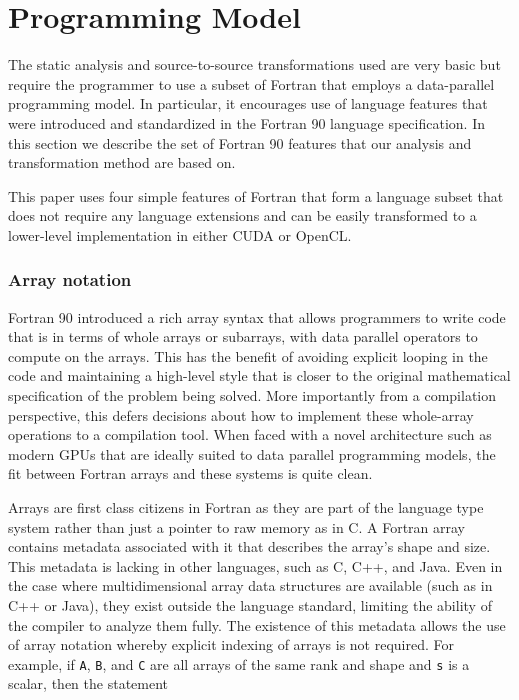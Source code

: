 \section{Programming Model}

The static analysis and source-to-source transformations used are very
basic but require the programmer to use a subset of Fortran
that employs a data-parallel programming model.  In particular, it
encourages use of language features that were introduced and
standardized in the Fortran 90 language specification.  In this
section we describe the set of Fortran 90 features that our analysis
and transformation method are based on.

This paper uses four simple features of Fortran that form a language subset
that does not require any language extensions and can be easily transformed
to a lower-level implementation in either CUDA or OpenCL.

\subsubsection*{Array notation}

Fortran 90 introduced a rich array syntax that allows programmers to
write code that is in terms of whole arrays or subarrays, with data
parallel operators to compute on the arrays.  This has the benefit of
avoiding explicit looping in the code and maintaining a high-level
style that is closer to the original mathematical specification of the
problem being solved.  More importantly from a compilation
perspective, this defers decisions about how to implement these
whole-array operations to a compilation tool.  When faced with a novel
architecture such as modern GPUs that are ideally suited to data parallel
programming models, the fit between Fortran arrays and these systems is
quite clean.

Arrays are first class citizens in Fortran as they are part of the language
type system rather than just a pointer to raw memory as in C. A Fortran array
contains metadata associated with it that describes the array's shape and
size. This metadata is lacking in other languages, such as C, C++, and Java.
Even in the case where multidimensional array data structures are available
(such as in C++ or Java), they exist outside the language standard, limiting
the ability of the compiler to analyze them fully. The existence of this
metadata allows the use of array notation whereby explicit indexing of arrays
is not required. For example, if {\tt A}, {\tt B}, and {\tt C} are all arrays
of the same rank and shape and {\tt s} is a scalar, then the statement

